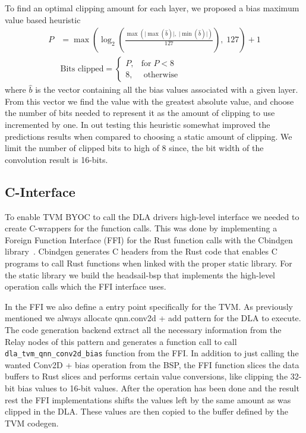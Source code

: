 \documentclass[12pt,a4paper,english
]{tunithesis}
\begin{document}
To find an optimal clipping amount for each layer, we proposed a bias maximum value based heuristic
\begin{align}
P & = \max \left( \log_{2} \left( \frac{\max \left( \mathopen| \max(\hat{b}) \mathclose|, \; \mathopen| \min(\hat{b}) \mathclose| \right)}{127} \right), \; 127 \right) + 1 \\
  & \text{Bits clipped} =
  \begin{cases}
    P, &  \text{for} \; P < 8  \\
    8, &  \; \text{otherwise}
  \end{cases}
\end{align}
where $\hat{b}$ is the vector containing all the bias values associated with a given layer. From this vector we find the value with the greatest absolute value, and choose the number of bits needed to represent it as the amount of clipping to use incremented by one. In out testing this heuristic somewhat improved the predictions results when compared to choosing a static amount of clipping.
We limit the number of clipped bits to high of 8 since, the bit width of the convolution result is 16-bits.


\subsection{C-Interface}
To enable TVM BYOC to call the DLA drivers high-level interface we needed to create C-wrappers for the function calls. This was done by implementing a Foreign Function Interface (FFI) for the Rust function calls with the Cbindgen library~\cite{cbindgen}. Cbindgen generates C headers from the Rust code that enables C programs to call Rust functions when linked with the proper static library. For the static library we build the headsail-bsp that implements the high-level operation calls which the FFI interface uses.

In the FFI we also define a entry point specifically for the TVM. As previously mentioned we always allocate qnn.conv2d + add pattern for the DLA to execute. The code generation backend extract all the necessary information from the Relay nodes of this pattern and generates a function call to call \texttt{dla\_tvm\_qnn\_conv2d\_bias} function from the FFI. In addition to just calling the wanted Conv2D + bias operation from the BSP, the FFI function slices the data buffers to Rust slices and performs certain value conversions, like clipping the 32-bit bias values to 16-bit values. After the operation has been done and the result rest the FFI implementations shifts the values left by the same amount as was clipped in the DLA. These values are then copied to the buffer defined by the TVM codegen.
\end{document}
